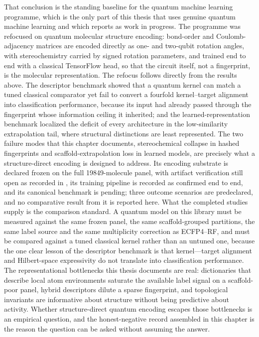 That conclusion is the standing baseline for the quantum machine learning programme, which is the only part of this thesis that uses genuine quantum machine learning and which  reports as work in progress. The programme was refocused on quantum molecular structure encoding\cite{Boy2025QMSE}: bond-order and Coulomb-adjacency matrices are encoded directly as one- and two-qubit rotation angles, with stereochemistry carried by signed rotation parameters, and trained end to end with a classical TensorFlow head, so that the circuit itself, not a fingerprint, is the molecular representation. The refocus follows directly from the results above. The descriptor benchmark showed that a quantum kernel can match a tuned classical comparator yet fail to convert a fourfold kernel--target alignment into classification performance, because its input had already passed through the fingerprint whose information ceiling it inherited; and the learned-representation benchmark localized the deficit of every architecture in the low-similarity extrapolation tail, where structural distinctions are least represented. The two failure modes that this chapter documents, stereochemical collapse in hashed fingerprints and scaffold-extrapolation loss in learned models, are precisely what a structure-direct encoding is designed to address. Its encoding substrate is declared frozen on the full \num{19849}-molecule panel, with artifact verification still open as recorded in , its training pipeline is recorded as confirmed end to end, and its canonical benchmark is pending; three outcome scenarios are predeclared, and no comparative result from it is reported here. What the completed studies supply is the comparison standard. A quantum model on this library must be measured against the same frozen panel, the same scaffold-grouped partitions, the same label source and the same multiplicity correction as ECFP4--RF, and must be compared against a tuned classical kernel rather than an untuned one, because the one clear lesson of the descriptor benchmark is that kernel---target alignment and Hilbert-space expressivity do not translate into classification performance. The representational bottlenecks this thesis documents are real: dictionaries that describe local atom environments saturate the available label signal on a scaffold-poor panel, hybrid descriptors dilute a sparse fingerprint, and topological invariants are informative about structure without being predictive about activity. Whether structure-direct quantum encoding escapes those bottlenecks is an empirical question, and the honest-negative record assembled in this chapter is the reason the question can be asked without assuming the answer.

